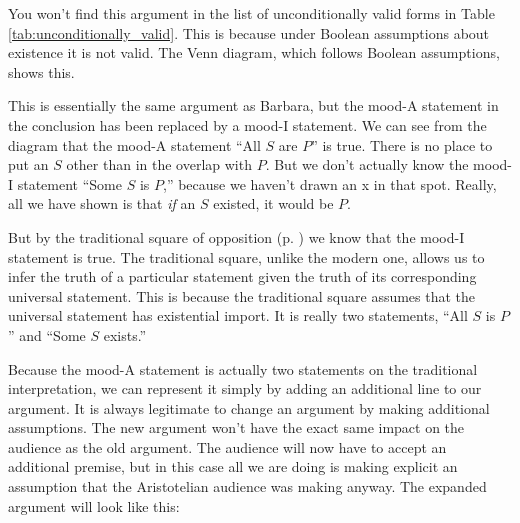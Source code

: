 \begin{kormanize}
\end{kormanize}

You won't find this argument in the list of unconditionally valid forms in Table \ref{tab:unconditionally_valid}. This is because under Boolean assumptions about existence it is not valid. The Venn diagram, which follows Boolean assumptions, shows this.






This is essentially the same argument as Barbara, but the mood-A statement in the conclusion has been replaced by a mood-I statement. We can see from the diagram that the mood-A statement ``All $S$ are $P$'' is true. There is no place to put an $S$ other than in the overlap with $P$. But we don't actually know the mood-I statement ``Some $S$ is $P$,'' because we haven't drawn an x in that spot. Really, all we have shown is that \emph{if} an $S$ existed, it would be $P$.

But by the traditional square of opposition (p. \pageref{fig:traditionalsquare}) we know that the mood-I statement is true. The traditional square, unlike the modern one, allows us to infer the truth of a particular statement given the truth of its corresponding universal statement. This is because the traditional square assumes that the universal statement has existential import. It is really two statements, ``All $S$ is $P$'' and ``Some $S$ exists.''

Because the mood-A statement is actually two statements on the traditional interpretation, we can represent it simply by adding an additional line to our argument. It is always legitimate to change an argument by making additional assumptions. The new argument won't have the exact same impact on the audience as the old argument. The audience will now have to accept an additional premise, but in this case all we are doing is making explicit an assumption that the Aristotelian audience was making anyway. The expanded argument will look like this:

\begin{kormanize}
\end{kormanize}

